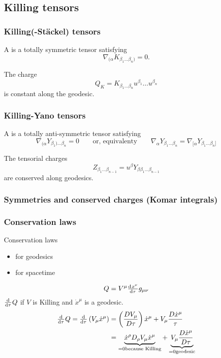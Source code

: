 \subsection{Killing tensors}

\subsubsection{Killing(-Stäckel) tensors}
A  is a totally symmetric tensor satisfying
\[ \nabla_{(\alpha}K_{\beta_1\ldots\beta_n)} = 0. \]

The charge
\[ Q_K = K_{\beta_1\ldots\beta_n}u^{\beta_1}\ldots u^{\beta_n} \]
is constant along the geodesic.

\subsubsection{Killing-Yano tensors}
A  is a totally anti-symmetric tensor satisfying
\[ \nabla_{(\alpha} Y_{\beta_1)\ldots\beta_n} = 0 \qquad \text{or, equivalenty} \qquad \nabla_\alpha Y_{\beta_1\ldots\beta_n} = \nabla_{[\alpha}Y_{\beta_1\ldots\beta_n]} \]

The tensorial charges
\[ Z_{\beta_1\ldots\beta_{n-1}} = u^\beta Y_{\beta\beta_1\ldots\beta_{n-1}} \]
are conserved along geodesics.


\subsubsection{Symmetries and conserved charges (Komar integrals)}
\subsubsection{Conservation laws}
Conservation laws
\begin{itemize}
\item for geodesics
\item for spacetime
\end{itemize}

\[ Q = V^\mu \od{x^\nu}{\tau}g_{\mu\nu} \]
$\od{}{\tau}Q$ if $V$ is Killing and $\dot{x}^\mu$ is a geodesic.
\begin{align}
\od{}{\tau}Q = \od{}{\tau}\left(V_\mu\dot{x}^\mu\right) &= \left(\frac{DV_\mu}{D\tau}\right)\dot{x}^\mu + V_\mu \frac{D\dot{x}^\mu}{\tau} \\
&= \underbrace{\dot{x}^\rho D_\rho V_\mu \dot{x}^\mu}_{=0 \text{because Killing}} + \underbrace{V_\mu \frac{D\dot{x}^\mu}{D\tau}}_{=0 \text{geodesic}}
\end{align}

